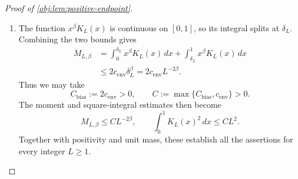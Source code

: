\begin{proof}[Proof of \cref{obj:lem:positive-endpoint}]
\begin{enumerate}
\item The function \(x^\beta K_L(x)\) is continuous on \([0,1]\), so its integral splits at \(\delta_L\). Combining the two bounds gives
\[
\begin{aligned}
M_{L,\beta}
&=
\int_0^{\delta_L}x^\beta K_L(x)\,dx
+
\int_{\delta_L}^1x^\beta K_L(x)\,dx\\
&\le
2c_{\mathrm{env}}\delta_L^\beta
=
2c_{\mathrm{env}}L^{-2\beta}.
\end{aligned}
\]
Thus we may take
\[
C_{\mathrm{bias}}:=2c_{\mathrm{env}}>0,
\qquad
C:=\max\{C_{\mathrm{bias}},c_{\mathrm{env}}\}>0.
\]
The moment and square-integral estimates then become
\[
M_{L,\beta}\le CL^{-2\beta},
\qquad
\int_0^1K_L(x)^2\,dx\le CL^2.
\]
Together with positivity and unit mass, these establish all the assertions for every integer \(L\ge1\).
\end{enumerate}
\end{proof}
